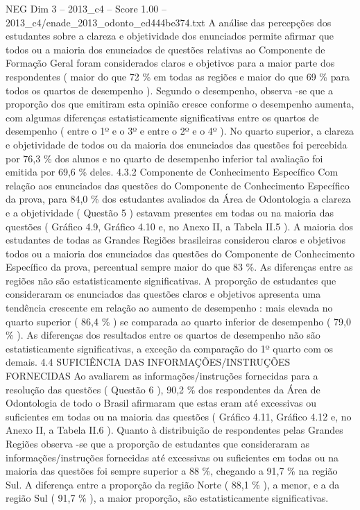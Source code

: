 \begin{textsample}{NEG Dim 3 – 2013\_c4 – Score 1.00 – 2013\_c4/enade\_2013\_odonto\_ed444be374.txt}
A análise das percepções dos estudantes sobre a clareza e objetividade dos enunciados permite afirmar que todos ou a maioria dos enunciados de questões relativas ao Componente de Formação Geral foram considerados claros e objetivos para a maior parte dos respondentes ( maior do que 72 \% em todas as regiões e maior do que 69 \% para todos os quartos de desempenho ).
Segundo o desempenho, observa -se que a proporção dos que emitiram esta opinião cresce conforme o desempenho aumenta, com algumas diferenças estatisticamente significativas entre os quartos de desempenho ( entre o 1º e o 3º e entre o 2º e o 4º ).
No quarto superior, a clareza e objetividade de todos ou da maioria dos enunciados das questões foi percebida por 76,3 \% dos alunos e no quarto de desempenho inferior tal avaliação foi emitida por 69,6 \% deles. 4.3.2 Componente de Conhecimento Específico Com relação aos enunciados das questões do Componente de Conhecimento Específico da prova, para 84,0 \% dos estudantes avaliados da Área de Odontologia a clareza e a objetividade ( Questão 5 ) estavam presentes em todas ou na maioria das questões ( Gráfico 4.9, Gráfico 4.10 e, no Anexo II, a Tabela II.5 ).
A maioria dos estudantes de todas as Grandes Regiões brasileiras considerou claros e objetivos todos ou a maioria dos enunciados das questões do Componente de Conhecimento Específico da prova, percentual sempre maior do que 83 \%.
As diferenças entre as regiões não são estatisticamente significativas.
A proporção de estudantes que consideraram os enunciados das questões claros e objetivos apresenta uma tendência crescente em relação ao aumento de desempenho : mais elevada no quarto superior ( 86,4 \% ) se comparada ao quarto inferior de desempenho ( 79,0 \% ).
As diferenças dos resultados entre os quartos de desempenho não são estatisticamente significativas, a exceção da comparação do 1º quarto com os demais. 4.4 SUFICIÊNCIA DAS INFORMAÇÕES/INSTRUÇÕES FORNECIDAS Ao avaliarem as informações/instruções fornecidas para a resolução das questões ( Questão 6 ), 90,2 \% dos respondentes da Área de Odontologia de todo o Brasil afirmaram que estas eram até excessivas ou suficientes em todas ou na maioria das questões ( Gráfico 4.11, Gráfico 4.12 e, no Anexo II, a Tabela II.6 ).
Quanto à distribuição de respondentes pelas Grandes Regiões observa -se que a proporção de estudantes que consideraram as informações/instruções fornecidas até excessivas ou suficientes em todas ou na maioria das questões foi sempre superior a 88 \%, chegando a 91,7 \% na região Sul.
A diferença entre a proporção da região Norte ( 88,1 \% ), a menor, e a da região Sul ( 91,7 \% ), a maior proporção, são estatisticamente significativas.

\end{textsample}
